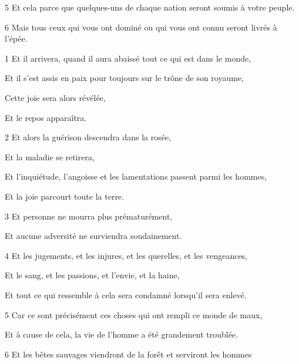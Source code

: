 \par 5 Et cela parce que quelques-uns de chaque nation seront soumis à votre peuple.

\par 6 Mais tous ceux qui vous ont dominé ou qui vous ont connu seront livrés à l'épée.


\par 1 Et il arrivera, quand il aura abaissé tout ce qui est dans le monde,

\par Et il s'est assis en paix pour toujours sur le trône de son royaume,

\par Cette joie sera alors révélée,

\par Et le repos apparaîtra.

\par 2 Et alors la guérison descendra dans la rosée,

\par Et la maladie se retirera,

\par Et l'inquiétude, l'angoisse et les lamentations passent parmi les hommes,

\par Et la joie parcourt toute la terre.

\par 3 Et personne ne mourra plus prématurément,

\par Et aucune adversité ne surviendra soudainement.

\par 4 Et les jugements, et les injures, et les querelles, et les vengeances,

\par Et le sang, et les passions, et l'envie, et la haine,

\par Et tout ce qui ressemble à cela sera condamné lorsqu'il sera enlevé.

\par 5 Car ce sont précisément ces choses qui ont rempli ce monde de maux,

\par Et à cause de cela, la vie de l'homme a été grandement troublée.

\par 6 Et les bêtes sauvages viendront de la forêt et serviront les hommes

